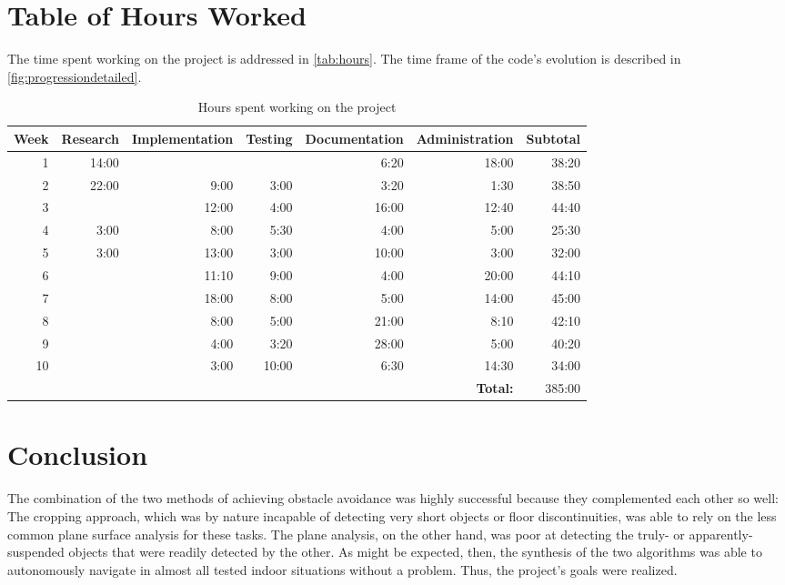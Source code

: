 \documentclass[12pt]{report}
\begin{document}
\section{Table of Hours Worked}
The time spent working on the project is addressed in \autoref{tab:hours}.  The time frame of the code's evolution is described in \autoref{fig:progressiondetailed}.
\begin{table}[h]
\caption[Hours worked]{Hours spent working on the project}
\label{tab:hours}
\begin{tabular}{| r | r | r | r | r | r | r |}
\hline
\scriptsize\textbf{Week} & \scriptsize\textbf{Research} & \scriptsize\textbf{Implementation} & \scriptsize\textbf{Testing} & \scriptsize\textbf{Documentation} & \scriptsize\textbf{Administration} & \scriptsize\textbf{Subtotal} \\
\hline\hline
1 & 14:00 &  &  & 6:20 & 18:00 & 38:20 \\
\hline
2 & 22:00 & 9:00 & 3:00 & 3:20 & 1:30 & 38:50 \\
\hline
3 &  & 12:00 & 4:00 & 16:00 & 12:40 & 44:40 \\
\hline
4 & 3:00 & 8:00 & 5:30 & 4:00 & 5:00 & 25:30 \\
\hline
5 & 3:00 & 13:00 & 3:00 & 10:00 & 3:00 & 32:00 \\
\hline
6 &  & 11:10 & 9:00 & 4:00 & 20:00 & 44:10 \\
\hline
7 &  & 18:00 & 8:00 & 5:00 & 14:00 & 45:00 \\
\hline
8 &  & 8:00 & 5:00 & 21:00 & 8:10 & 42:10 \\
\hline
9 &  & 4:00 & 3:20 & 28:00 & 5:00 & 40:20 \\
\hline
10 &  & 3:00 & 10:00 & 6:30 & 14:30 & 34:00 \\
\hline\hline
&&&&& \scriptsize\textbf{Total:} & 385:00 \\
\hline
\end{tabular}
\end{table}

\section{Conclusion}
The combination of the two methods of achieving obstacle avoidance was highly successful because they complemented each other so well:  The cropping approach, which was by nature incapable of detecting very short objects or floor discontinuities, was able to rely on the less common plane surface analysis for these tasks.  The plane analysis, on the other hand, was poor at detecting the truly- or apparently-suspended objects that were readily detected by the other.  As might be expected, then, the synthesis of the two algorithms was able to autonomously navigate in almost all tested indoor situations without a problem.  Thus, the project's goals were realized.
\end{document}
